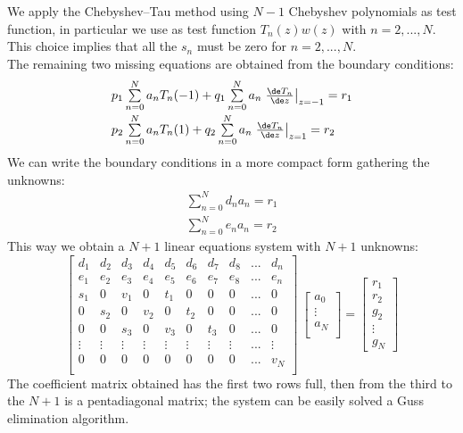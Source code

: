 We apply the Chebyshev--Tau method using $N-1$ Chebyshev polynomials as test function, in particular we use as test function $T_n(z)w(z)$ with $n=2,...,N$.\\
This choice implies that all the $s_n$ must be zero for $n=2,...,N$.\\
The remaining two missing equations are obtained from the boundary conditions:
\[
\begin{array}{l}
p_1\sum\limits_{n=0}^N a_n T_n(-1)+q_1\sum\limits_{n=0}^N a_n\left.\frac{\de T_n}{\de z}\right|_{z=-1}=r_1\\[2ex]
p_2\sum\limits_{n=0}^N a_n T_n(1)+q_2\sum\limits_{n=0}^N a_n\left.\frac{\de T_n}{\de z}\right|_{z=1}=r_2\\
\end{array}
\]
We can write the boundary conditions in a more compact form gathering the unknowns:
\[
\begin{array}{l}
\sum\limits_{n=0}^N d_n a_n=r_1\\[2ex]
\sum\limits_{n=0}^N e_n a_n=r_2
\end{array}
\]
This way we obtain a $N+1$ linear equations system with $N+1$ unknowns:
\[
\begin{bmatrix}
d_1 &d_2 &d_3&d_4&d_5& d_6&d_7& d_8&... &d_n\\
e_1 &e_2&e_3& e_4&e_5& e_6&e_7&e_8&... &e_n\\
s_1&0 &v_1& 0 & t_1& 0 & 0&0&... &0\\
0 & s_2 & 0 & v_2 & 0 & t_2& 0&0&... &0\\
0&0 & s_3 & 0 & v_3 & 0 & t_3& 0&... &0\\
\vdots&\vdots&\vdots&\vdots&\vdots&\vdots&\vdots&\vdots&...&\vdots\\
0&0&0&0&0&0&0&0&...&v_N\\
\end{bmatrix}\
\begin{bmatrix}
a_0\\
\vdots\\
a_N\\
\end{bmatrix}
=
\begin{bmatrix}
r_1\\
r_2\\
g_2\\
\vdots\\
g_N
\end{bmatrix}
\]
The coefficient matrix obtained has the first two rows full, then from the third to the $N+1$ is a pentadiagonal matrix; the system can be easily solved a Guss elimination algorithm.

